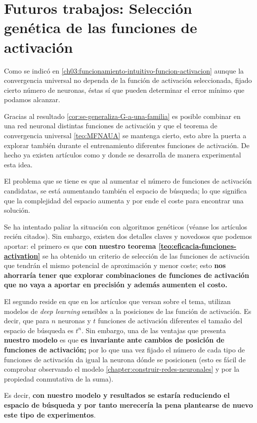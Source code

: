 \newpage
\chapter{Futuros trabajos: Selección genética de las funciones de activación }
\label{ch08:genetic-selection}

Como se indicó en \ref{ch03:funcionamiento-intuitivo-funcion-activacion}
aunque la convergencia universal no 
dependa de la función de activación seleccionada,
fijado cierto número de neuronas, éstas sí que pueden 
determinar el error mínimo que podamos alcanzar.  

Gracias al resultado \ref{cor:se-generaliza-G-a-una-familia} es posible combinar en una red neuronal distintas funciones de activación y que el teorema de convergencia universal \ref{teo:MFNAUA} se mantenga cierto, esto abre la puerta a explorar también durante el entrenamiento diferentes funciones de activación. De hecho ya existen artículos como \cite{FunctionOptimizationwithGeneticAlgorithms} y \cite{Genetic-deep-neural-networks} donde se desarrolla de manera experimental esta idea. 

El problema que se tiene es que al aumentar
el número de funciones de activación candidatas, se está aumentando también el espacio de búsqueda; lo que significa que la complejidad del espacio aumenta y por ende el coste para encontrar una solución. 

Se ha intentado paliar la situación con algoritmos genéticos (véanse los artículos recién citados). Sin embargo, existen dos detalles claves y novedosos que podemos aportar: el primero es que \textbf{con nuestro teorema \ref{teo:eficacia-funciones-activation}}  se ha obtenido un 
criterio de selección de las funciones de activación que 
tendrán el mismo potencial de aproximación y menor coste; 
esto \textbf{nos ahorraría tener que explorar combinaciones de 
funciones de activación que no vaya a aportar en precisión y 
además aumenten el costo.} 


El segundo reside en que en los artículos que versan sobre el tema, 
utilizan modelos de \textit{deep learning} sensibles a la posiciones de las función de activación. Es decir, que para $n$ neuronas y $t$ funciones de activación diferentes el tamaño del espacio de búsqueda es $t^n$. Sin embargo, una de las ventajas que presenta \textbf{nuestro modelo} es que \textbf{es invariante ante cambios de posición de funciones de activación;} por lo que una vez fijado el número de cada tipo de funciones de activación da igual la neurona dónde se posicionen (esto es fácil de comprobar observando el modelo \ref{chapter:construir-redes-neuronales} y por la propiedad conmutativa de la suma).

Es decir, \textbf{con nuestro modelo y resultados se estaría reduciendo el espacio de búsqueda y por tanto merecería la pena plantearse de nuevo este tipo de experimentos}. 

